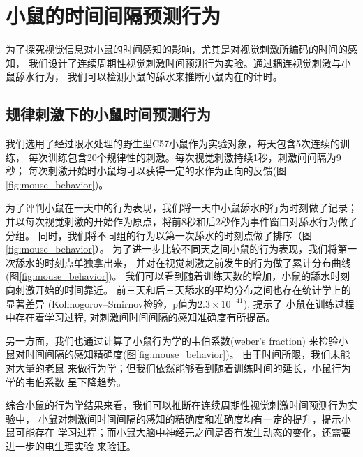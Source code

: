 
\section{小鼠的时间间隔预测行为}
为了探究视觉信息对小鼠的时间感知的影响，尤其是对视觉刺激所编码的时间的感知，
我们设计了连续周期性视觉刺激时间预测行为实验。通过耦连视觉刺激与小鼠舔水行为，
我们可以检测小鼠的舔水来推断小鼠内在的计时。

\subsection{规律刺激下的小鼠时间预测行为}
我们选用了经过限水处理的野生型C57小鼠作为实验对象，每天包含5次连续的训练，
每次训练包含20个规律性的刺激。每次视觉刺激持续1秒，刺激间间隔为9秒；
每次刺激开始时小鼠均可以获得一定的水作为正向的反馈(图\ref{fig:mouse_behavior})。

为了评判小鼠在一天中的行为表现，我们将一天中小鼠舔水的行为时刻做了记录；
并以每次视觉刺激的开始作为原点，将前8秒和后2秒作为事件窗口对舔水行为做了分组。
同时，我们将不同组的行为以第一次舔水的时刻点做了排序（图\ref{fig:mouse_behavior}）。
为了进一步比较不同天之间小鼠的行为表现，我们将第一次舔水的时刻点单独拿出来，
并对在视觉刺激之前发生的行为做了累计分布曲线(图\ref{fig:mouse_behavior})。
我们可以看到随着训练天数的增加，小鼠的舔水时刻向刺激开始的时间靠近。
前三天和后三天舔水的平均分布之间也存在统计学上的显著差异
(Kolmogorov–Smirnov检验，p值为$2.3 \times 10 ^ {-41}$), 提示了
小鼠在训练过程中存在着学习过程, 对刺激间时间间隔的感知准确度有所提高。

另一方面，我们也通过计算了小鼠行为学的韦伯系数(weber's fraction)
来检验小鼠对时间间隔的感知精确度(图\ref{fig:mouse_behavior})。
由于时间所限，我们未能对大量的老鼠
来做行为学；但我们依然能够看到随着训练时间的延长，小鼠行为学的韦伯系数
呈下降趋势。

综合小鼠的行为学结果来看，我们可以推断在连续周期性视觉刺激时间预测行为实验中，
小鼠对刺激间时间间隔的感知的精确度和准确度均有一定的提升，提示小鼠可能存在
学习过程；而小鼠大脑中神经元之间是否有发生动态的变化，还需要进一步的电生理实验
来验证。

